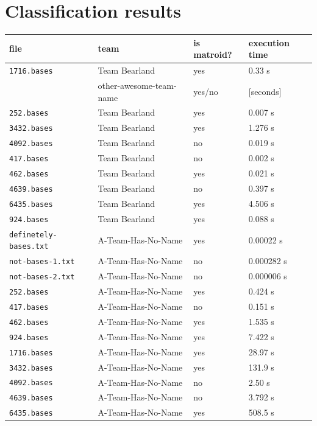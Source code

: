 \documentclass[11pt]{amsart}
\begin{document}
\section{Classification results}

\begin{center}
  \begin{tabular}[c]{llll}
    file
    & team
    & is matroid?
    & execution time
    \\\hline
    \texttt{1716.bases}
    & Team Bearland
    & yes
    & 0.33 s
    \\
    & other-awesome-team-name
    & yes/no
    & [seconds]
    \\\hline
      \texttt{252.bases}
    & Team Bearland
    & yes
    & 0.007 s
    \\\hline
      \texttt{3432.bases}
    & Team Bearland
    & yes
    & 1.276 s
    \\\hline
      \texttt{4092.bases}
    & Team Bearland
    & no
    & 0.019 s
    \\\hline
      \texttt{417.bases}
    & Team Bearland
    & no
    & 0.002 s
    \\\hline
      \texttt{462.bases}
    & Team Bearland
    & yes
    & 0.021 s
    \\\hline
      \texttt{4639.bases}
    & Team Bearland
    & no
    & 0.397 s
    \\\hline
    \texttt{6435.bases}
    & Team Bearland
    & yes
    & 4.506 s
    \\\hline
    \texttt{924.bases}
    & Team Bearland
    & yes
    & 0.088 s
    \\\hline
    \texttt{definetely-bases.txt}
    & A-Team-Has-No-Name
    & yes
    & 0.00022 s
    \\\hline
    \texttt{not-bases-1.txt}
    & A-Team-Has-No-Name
    & no
    & 0.000282 s
    \\\hline
    \texttt{not-bases-2.txt}
    & A-Team-Has-No-Name
    & no
    & 0.000006 s
    \\\hline
    \texttt{252.bases}
    & A-Team-Has-No-Name
    & yes
    & 0.424 s
    \\\hline
    \texttt{417.bases}
    & A-Team-Has-No-Name
    & no
    & 0.151 s
    \\\hline
    \texttt{462.bases}
    & A-Team-Has-No-Name
    & yes
    & 1.535 s
    \\\hline
    \texttt{924.bases}
    & A-Team-Has-No-Name
    & yes
    & 7.422 s
    \\\hline
    \texttt{1716.bases}
    & A-Team-Has-No-Name
    & yes
    & 28.97 s
    \\\hline
    \texttt{3432.bases}
    & A-Team-Has-No-Name
    & yes
    & 131.9 s
    \\\hline
    \texttt{4092.bases}
    & A-Team-Has-No-Name
    & no
    & 2.50 s
    \\\hline
    \texttt{4639.bases}
    & A-Team-Has-No-Name
    & no
    & 3.792 s
    \\\hline
    \texttt{6435.bases}
    & A-Team-Has-No-Name
    & yes
    & 508.5 s
    \\\hline    
  \end{tabular}
\end{center}
\end{document}
